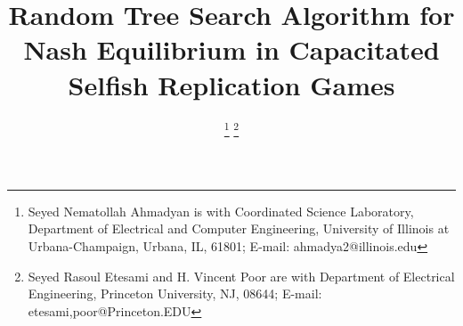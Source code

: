 \documentclass[conference, 10pt, twocolumn]{ieeeconf}
\begin{document}
\title{Random Tree Search Algorithm for Nash Equilibrium in Capacitated Selfish
Replication Games}
\author{
  \authorblockA{}
\thanks{\textdagger Seyed Nematollah Ahmadyan is with
Coordinated Science Laboratory,
Department of Electrical and Computer Engineering,
University of Illinois at Urbana-Champaign, Urbana, IL, 61801;
E-mail: {ahmadya2}@illinois.edu}
\thanks{
\textdaggerdbl Seyed Rasoul Etesami and H. Vincent Poor are with
Department of Electrical Engineering,
Princeton University, NJ, 08644;
E-mail: etesami,poor@Princeton.EDU}
}
\maketitle








\end{document}
